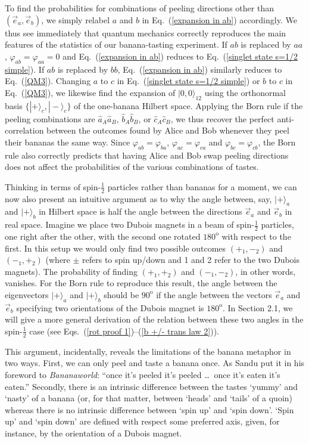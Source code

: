 To find the probabilities for combinations of peeling directions other than $(\vec{e}_a, \vec{e}_b)$, we simply relabel $a$ and $b$ in Eq.\ (\ref{expansion in ab}) accordingly.  We thus see immediately that quantum mechanics correctly reproduces  the main features of the statistics of our banana-tasting experiment. If $ab$ is replaced by $aa$, $\varphi_{ab} = \varphi_{aa} = 0$ and Eq.\ (\ref{expansion in ab}) reduces to Eq.\ (\ref{singlet state s=1/2 simple}). If $ab$ is replaced by $bb$, Eq.\ (\ref{expansion in ab}) similarly reduces to Eq.\ (\ref{QM3}). Changing $a$ to $c$ in Eq.\ (\ref{singlet state s=1/2 simple}) or $b$ to $c$ in Eq.\ (\ref{QM3}), we likewise find the expansion of $|0, 0\rangle_{12}$ using the orthonormal basis $\{ | + \rangle_c,  | - \rangle_c \}$ of the one-banana Hilbert space. Applying the Born rule if the peeling combinations are $\hat{a}_A\hat{a}_B$, $\hat{b}_A\hat{b}_B$, or $\hat{c}_A\hat{c}_B$, we thus recover the perfect anti-correlation between the outcomes found by Alice and Bob whenever they peel their bananas the same way. Since $\varphi_{ab} = \varphi_{ba}$, $\varphi_{ac} = \varphi_{ca}$ and $\varphi_{bc} = \varphi_{cb}$, the Born rule also correctly predicts that having Alice and Bob swap peeling directions does not affect the probabilities of the various combinations of tastes. 

Thinking in terms of spin-$\frac12$ particles rather than bananas for a moment, we can now also present an intuitive argument as to why the angle between, say, $|+\rangle_a$ and $|+\rangle_b$ in Hilbert space is half the angle between the directions $\vec{e}_a$ and $\vec{e}_b$ in real space. Imagine we place two Dubois magnets in a beam of spin-$\frac12$ particles, one right after the other, with the second one rotated $180^{\mathrm o}$ with respect to the first. In this setup we would only find two possible outcomes $(+_1, -_2)$ and $(-_1, +_2)$ (where $\pm$ refers to spin up/down and 1 and 2 refer to the two Dubois magnets). The probability of finding $(+_1, +_2)$ and $(-_1, -_2)$, in other words, vanishes. For the Born rule to reproduce this result, the angle between the eigenvectors $|+\rangle_a$ and $|+\rangle_b$ should be $90^{\mathrm o}$ if the angle between the vectors $\vec{e}_a$ and $\vec{e}_b$ specifying two orientations of the Dubois magnet is $180^{\mathrm o}$. In Section 2.1, we will give a more general derivation of the relation between these two angles in the spin-$\frac12$ case (see Eqs.\ (\ref{rot proof 1})--(\ref{b +/- trans law 2})).

This argument, incidentally, reveals the limitations of the banana metaphor in two ways. First, we can only peel and taste a banana once. As Sandu \citet[p.\ vi]{Popescu 2016} put it in his foreword to \emph{Bananaworld}: ``once it's peeled it's peeled \ldots\ once it's eaten it's eaten.'' Secondly, there is an intrinsic difference between the tastes `yummy' and `nasty' of a banana (or, for that matter, between `heads' and `tails' of a quoin) whereas there is no intrinsic difference between `spin up' and `spin down'. `Spin up' and `spin down' are defined with respect some preferred axis, given, for instance, by the orientation of a Dubois magnet. 

